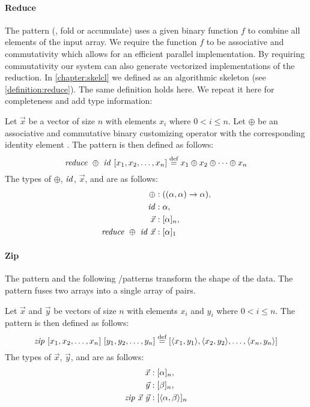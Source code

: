 \paragraph{Reduce}
The \reduce pattern (\aka, fold or accumulate) uses a given binary function $f$ to combine all elements of the input array.
We require the function $f$ to be associative and commutativity which allows for an efficient parallel implementation.
By requiring commutativity our system can also generate vectorized implementations of the reduction.
In \autoref{chapter:skelcl} we defined \reduce as an algorithmic skeleton (see \autoref{definition:reduce}).
The same definition holds here.
We repeat it here for completeness and add type information:
\begin{definition}
  \label{definition:pattern:reduce}
  Let $\vec{x}$ be a vector of size $n$ with elements $x_i$ where $0 < i \leq n$.
  Let $\oplus$ be an associative and commutative binary customizing operator with the corresponding identity element \id.
  The \reduce pattern is then defined as follows:
  \begin{equation*}
    \text{\textit{reduce}}\ \oplus\ \text{\textit{id}}\ [x_1, x_2, \dots, x_n]
      \stackrel{\textrm{\scriptsize def}}{=} x_1 \oplus x_2 \oplus \dots \oplus x_n
  \end{equation*}
  The types of $\oplus$, $\text{\textit{id}}$, $\vec{x}$, and \reduce are as follows:
  \begin{align*}
    \oplus &: ((\alpha, \alpha) \rightarrow \alpha),\\
    \text{\textit{id}} &: \alpha,\\
    \vec{x} &: [\alpha]_n,\\
    \text{\textit{reduce}}\ \oplus\ \text{\textit{id}}\ \vec{x} &: [\alpha]_1
  \end{align*}
\end{definition}


\paragraph{Zip}
The \zip pattern and the following \splitN/\join patterns transform the shape of the data. %
The \zip pattern fuses two arrays into a single array of pairs.

\begin{definition}
  \label{definition:pattern:zip}
  Let $\vec{x}$ and $\vec{y}$ be vectors of size $n$ with elements $x_i$ and $y_i$ where $0 < i \leq n$.
  The \zip pattern is then defined as follows:
  \begin{equation*}
    \text{\textit{zip}}\ [x_1, x_2, \dots, x_n]\ [y_1, y_2, \dots, y_n]\\
      \stackrel{\textrm{\scriptsize def}}{=} [\langle x_1, y_1\rangle, \langle x_2, y_2\rangle, \dots, \langle x_n, y_n\rangle]
  \end{equation*}
  The types of $\vec{x}$, $\vec{y}$, and \zip are as follows:
  \begin{align*}
    \vec{x} &: [\alpha]_n,\\
    \vec{y} &: [\beta]_n,\\
    \text{\textit{zip}}\ \vec{x}\ \vec{y} &: [\langle\alpha, \beta\rangle]_n
  \end{align*}
\end{definition}

